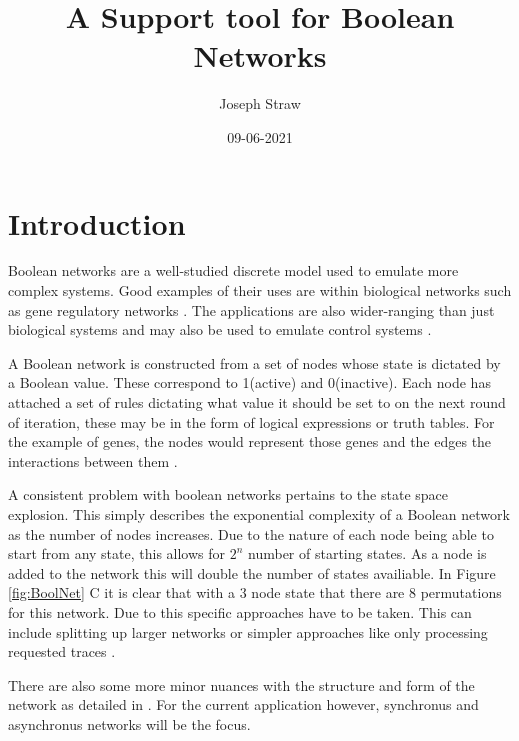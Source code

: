 \documentclass[12pt, letterpaper]{article}
\title{A Support tool for Boolean Networks}
\date{09-06-2021}
\author{Joseph Straw}
\begin{document}
  \maketitle
  \newpage

  \section{Introduction}

    Boolean networks are a well-studied discrete model used to emulate more
    complex systems. Good examples of their uses are within biological
    networks such as gene regulatory networks \cite{SCHWAB2020571} \cite{TRAN2016107}. 
    The applications are also wider-ranging than just biological systems and may also
    be used to emulate control systems \cite{Valverde:2020we}.

    A Boolean network is constructed from a set of nodes whose state is 
    dictated by a Boolean value. These correspond to 1(active) and 0(inactive). 
    Each node has attached a set of rules dictating what value it should be set 
    to on the next round of iteration, these may be in the form of logical 
    expressions or truth tables. For the example of genes, the nodes would 
    represent those genes and the edges the interactions between them \cite{RISTEVSKI2015111}.

    A consistent problem with boolean networks pertains to the state space explosion.
    This simply describes the exponential complexity of a Boolean network as the 
    number of nodes increases. Due to the nature of each node being able to start from 
    any state, this allows for \(2^n\) number of starting states. As a node is added to 
    the network this will double the number of states availiable. In Figure \ref{fig:BoolNet} C
    it is clear that with a 3 node state that there are 8 permutations for this network. Due 
    to this specific approaches have to be taken. This can include splitting up larger networks 
    or simpler approaches like only processing requested traces \cite{RISTEVSKI2015111}.

    There are also some more minor nuances with the structure and form of the network as detailed in 
    \cite{10.3389/fphys.2018.00586}. For the current application however, synchronus and asynchronus networks
    will be the focus.
    
\end{document}
